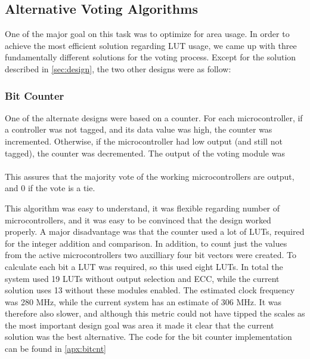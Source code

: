 
\subsection{Alternative Voting Algorithms}
One of the major goal on this task was to optimize for area usage. In
order to achieve the most efficient solution regarding LUT usage, we
came up with three fundamentally different solutions for the voting
process. Except for the solution described in \autoref{sec:design},
the two other designs were as follow:

\subsubsection{Bit Counter}
One of the alternate designs were based on a counter. For each
microcontroller, if a controller was not tagged, and its data value
was high, the counter was incremented. Otherwise, if the
microcontroller had low output (and still not tagged), the counter was
decremented. The output of
the voting module was\\\hspace*{.3in}{\ttfamily if cnt > 0 then 1 else 0}\\
This assures that the majority vote of the working microcontrollers
are output, and 0 if the vote is a tie.

This algorithm was easy to understand, it was flexible regarding
number of microcontrollers, and it was easy to be convinced that the
design worked properly. A major disadvantage was that the counter used
a lot of LUTs, required for the integer addition and comparison. In
addition, to count just the values from the active microcontrollers
two auxilliary four bit vectors were created. To calculate each bit a
LUT was required, so this used eight LUTs. In total the system used 19
LUTs without output selection and ECC, while the current solution uses
13 without these modules enabled. The estimated clock frequency was
280 MHz, while the current system has an estimate of 306 MHz. It was
therefore also slower, and although this metric could not have tipped
the scales as the most important design goal was area it made it clear
that the current solution was the best alternative. The code for the
bit counter implementation can be found in \autoref{apx:bitcnt}

